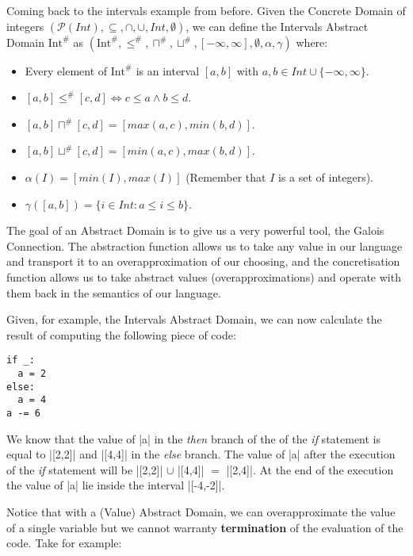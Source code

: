 Coming back to the intervals example from before. Given the Concrete
Domain of integers
\((\mathcal{P}(Int), \subseteq, \cap, \cup, Int, \emptyset)\), we can
define the Intervals Abstract Domain \(\text{Int}^{\#}\) as
\((\text{Int}^{\#}, \le^{\#}, \sqcap^{\#}, \sqcup^{\#}, [-\infty,\infty], \emptyset, \alpha, \gamma)\)
where:

\begin{itemize}
\tightlist
\item
  Every element of \(\text{Int}^{\#}\) is an interval \([a, b]\) with
  \(a, b \in Int \cup \{-\infty,\infty\}\).
\item
  \([a, b] \le^{\#} [c, d] \iff c \le a \wedge b \le d\).
\item
  \([a, b] \sqcap^{\#} [c, d] = [max(a,c), min(b, d)]\).
\item
  \([a, b] \sqcup^{\#} [c, d] = [min(a,c), max(b, d)]\).
\item
  \(\alpha(I) = [min(I), max(I)]\) (Remember that \(I\) is a set of
  integers).
\item
  \(\gamma([a, b]) = \{i \in Int : a \le i \le b\}\).
\end{itemize}

The goal of an Abstract Domain is to give us a very powerful tool, the
Galois Connection. The abstraction function allows us to take any value
in our language and transport it to an overapproximation of our
choosing, and the concretisation function allows us to take abstract
values (overapproximations) and operate with them back in the semantics
of our language.

Given, for example, the Intervals Abstract Domain, we can now calculate
the result of computing the following piece of code:

\begin{verbatim}
if _:
  a = 2
else:
  a = 4
a -= 6
\end{verbatim}

We know that the value of \pycode|a| in the \emph{then} branch of the of
the \emph{if} statement is equal to \pycode|[2,2]| and
\pycode|[4,4]| in the \emph{else} branch. The value of \pycode|a|
after the execution of the \emph{if} statement will be
\pycode|[2,2]| \(\cup{}\) \pycode|[4,4]| \(=\)
\pycode|[2,4]|. At the end of the execution the value of \pycode|a|
lie inside the interval \pycode|[-4,-2]|.

Notice that with a (Value) Abstract Domain, we can overapproximate the
value of a single variable but we cannot warranty \textbf{termination}
of the evaluation of the code. Take for example:

